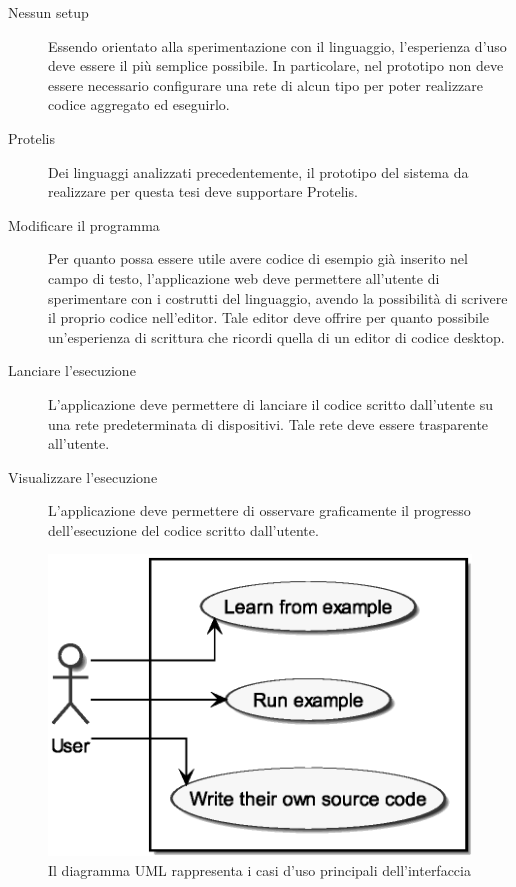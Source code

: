       \begin{description}
        \item[Nessun setup]
          Essendo orientato alla sperimentazione con il linguaggio, l'esperienza d'uso deve essere il più semplice possibile.
          In particolare, nel prototipo non deve essere necessario configurare una rete di alcun tipo per poter realizzare codice aggregato ed eseguirlo.

        \item[Protelis]
          Dei linguaggi analizzati precedentemente, il prototipo del sistema da realizzare per questa tesi deve supportare Protelis.

        \item[Modificare il programma]
          Per quanto possa essere utile avere codice di esempio già inserito nel campo di testo, l'applicazione web deve permettere all'utente di sperimentare con i costrutti del linguaggio, avendo la possibilità di scrivere il proprio codice nell'editor.
          Tale editor deve offrire per quanto possibile un'esperienza di scrittura che ricordi quella di un editor di codice desktop.

        \item[Lanciare l'esecuzione]
          L'applicazione deve permettere di lanciare il codice scritto dall'utente su una rete predeterminata di dispositivi.
          Tale rete deve essere trasparente all'utente.

        \item[Visualizzare l'esecuzione]
          L'applicazione deve permettere di osservare graficamente il progresso dell'esecuzione del codice scritto dall'utente.
      \end{description}

      \begin{figure}[htbp]
        \centering
        \includegraphics[width=.6\textwidth]{res/uml/use-cases-frontend.eps}%
        \caption{Il diagramma UML rappresenta i casi d'uso principali dell'interfaccia}%
        \label{fig:uml-use-case}
      \end{figure}

